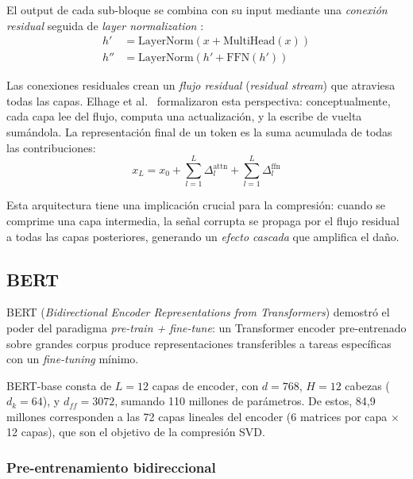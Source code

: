 El output de cada sub-bloque se combina con su input mediante una \emph{conexión
residual} \cite{he2016deep} seguida de \emph{layer normalization} \cite{ba2016layer}:
\begin{align}
    h'  &= \text{LayerNorm}(x + \text{MultiHead}(x)) \label{eq:residual-attn} \\
    h'' &= \text{LayerNorm}(h' + \text{FFN}(h')) \label{eq:residual-ffn}
\end{align}

Las conexiones residuales crean un \emph{flujo residual} (\textit{residual stream})
que atraviesa todas las capas. Elhage et al.\ \cite{elhage2021mathematical}
formalizaron esta perspectiva: conceptualmente, cada capa lee del flujo, computa una
actualización, y la escribe de vuelta sumándola. La representación final de un token
es la suma acumulada de todas las contribuciones:
\begin{equation}
    x_L = x_0 + \sum_{l=1}^{L} \Delta_l^{\text{attn}} + \sum_{l=1}^{L} \Delta_l^{\text{ffn}}
    \label{eq:residual-stream}
\end{equation}

Esta arquitectura tiene una implicación crucial para la compresión: cuando se comprime
una capa intermedia, la señal corrupta se propaga por el flujo residual a todas las
capas posteriores, generando un \emph{efecto cascada} que amplifica el daño.

\subsection{BERT}
\label{sec:sota-bert}

BERT (\textit{Bidirectional Encoder Representations from Transformers})
\cite{devlin2019bert} demostró el poder del paradigma \textit{pre-train + fine-tune}:
un Transformer encoder pre-entrenado sobre grandes corpus produce representaciones
transferibles a tareas específicas con un \emph{fine-tuning} mínimo.

BERT-base consta de $L = 12$ capas de encoder, con $d = 768$, $H = 12$ cabezas
($d_k = 64$), y $d_{ff} = 3072$, sumando 110 millones de parámetros. De estos,
84{,}9 millones corresponden a las 72 capas lineales del encoder (6 matrices por
capa $\times$ 12 capas), que son el objetivo de la compresión SVD.

\subsubsection{Pre-entrenamiento bidireccional}
\label{sec:sota-bert-pretraining}


